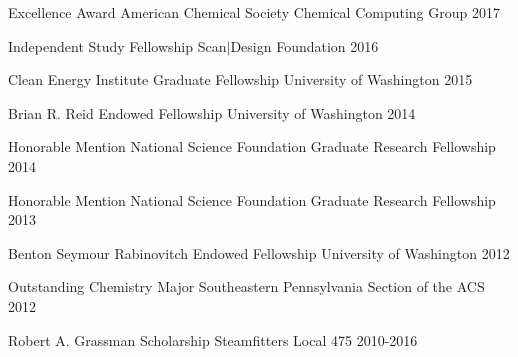 



\begin{cvhonors}

\cvhonor
{Excellence Award} %
{American Chemical Society Chemical Computing Group} %
{} %
{2017} %


\cvhonor
{Independent Study Fellowship} %
{Scan$|$Design Foundation} %
{} %
{2016} %


\cvhonor
{Clean Energy Institute Graduate Fellowship} %
{University of Washington} %
{} %
{2015} %


\cvhonor
{Brian R. Reid Endowed Fellowship} %
{University of Washington} %
{} %
{2014} %


\cvhonor
{Honorable Mention} %
{National Science Foundation Graduate Research Fellowship} %
{} %
{2014} %


\cvhonor
{Honorable Mention} %
{National Science Foundation Graduate Research Fellowship} %
{} %
{2013} %


\cvhonor
{Benton Seymour Rabinovitch Endowed Fellowship} %
{University of Washington} %
{} %
{2012} %


\cvhonor
{Outstanding Chemistry Major} %
{Southeastern Pennsylvania Section of the ACS} %
{} %
{2012} %


\cvhonor
{Robert A. Grassman Scholarship} %
{Steamfitters Local 475} %
{} %
{2010-2016} %


\end{cvhonors}